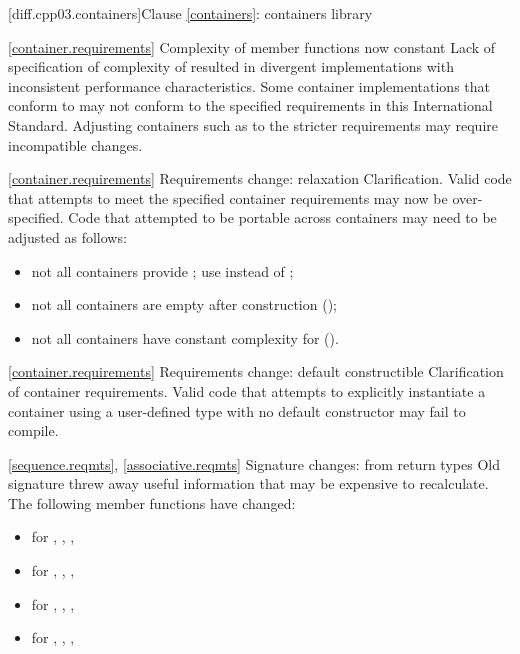 [diff.cpp03.containers]{Clause \ref{containers}: containers library}

\ref{container.requirements}
\change Complexity of  member functions now constant
\rationale Lack of specification of complexity of  resulted in
divergent implementations with inconsistent performance characteristics.
\effect
Some container implementations that conform to \CppIII may not conform to the
specified  requirements in this International Standard. Adjusting
containers such as  to the stricter requirements may require
incompatible changes.

\ref{container.requirements}
\change Requirements change: relaxation
\rationale Clarification.
\effect
Valid \CppIII code that attempts to meet the specified container requirements
may now be over-specified. Code that attempted to be portable across containers
may need to be adjusted as follows:
\begin{itemize}
\item not all containers provide ; use  instead
of ;
\item not all containers are empty after construction ();
\item not all containers have constant complexity for  ().
\end{itemize}

\ref{container.requirements}
\change Requirements change: default constructible
\rationale Clarification of container requirements.
\effect
Valid \CppIII code that attempts to explicitly instantiate a container using
a user-defined type with no default constructor may fail to compile.

\ref{sequence.reqmts}, \ref{associative.reqmts}
\change Signature changes: from  return types
\rationale Old signature threw away useful information that may be expensive
to recalculate.
\effect
The following member functions have changed:
\begin{itemize}
\item {} for , , , 
\item {} for , , , 
\item {} for , , , 
\item {} for , , , 
\end{itemize}

